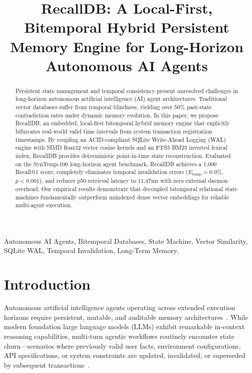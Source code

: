 \documentclass[conference]{IEEEtran}
\begin{document}
\title{RecallDB: A Local-First, Bitemporal Hybrid Persistent Memory Engine for Long-Horizon Autonomous AI Agents}

\author{
}

\maketitle

\begin{abstract}
Persistent state management and temporal consistency present unresolved challenges in long-horizon autonomous artificial intelligence (AI) agent architectures. Traditional vector databases suffer from temporal blindness, yielding over 50\% past-state contradiction rates under dynamic memory evolution. In this paper, we propose RecallDB, an embedded, local-first bitemporal hybrid memory engine that explicitly bifurcates real-world valid time intervals from system transaction registration timestamps. By coupling an ACID-compliant SQLite Write-Ahead Logging (WAL) engine with SIMD float32 vector cosine kernels and an FTS5 BM25 inverted lexical index, RecallDB provides deterministic point-in-time state reconstruction. Evaluated on the SynTemp-100 long-horizon agent benchmark, RecallDB achieves a 1.000 Recall@1 score, completely eliminates temporal invalidation errors ($E_\text{temp} = 0.0\%$, $p < 0.001$), and reduces p50 retrieval latency to 11.47ms with zero external daemon overhead. Our empirical results demonstrate that decoupled bitemporal relational state machines fundamentally outperform unindexed dense vector embeddings for reliable multi-agent execution.
\end{abstract}

\begin{IEEEkeywords}
Autonomous AI Agents, Bitemporal Databases, State Machine, Vector Similarity, SQLite WAL, Temporal Invalidation, Long-Term Memory.
\end{IEEEkeywords}

\section{Introduction}

Autonomous artificial intelligence agents operating across extended execution horizons require persistent, mutable, and auditable memory architectures~\cite{park2023generative}. While modern foundation large language models (LLMs) exhibit remarkable in-context reasoning capabilities, multi-turn agentic workflows routinely encounter state churn—scenarios where previously valid user facts, environment configurations, API specifications, or system constraints are updated, invalidated, or superseded by subsequent transactions~\cite{zhou2026evaluating}.
\end{document}
